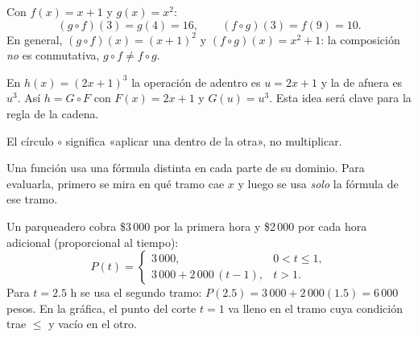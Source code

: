 \documentclass[11pt,a4paper]{article}
\let\nivelorig\nivel
\renewcommand{\nivel}[2]{\Needspace{8\baselineskip}\nivelorig{#1}{#2}}
\begin{document}
\begin{figura}[La composición encadena máquinas. Con $f(x)=x+1$ y $g(x)=x^2$: $g(f(3))=g(4)=16$.]
\end{figura}

\begin{ejemplo}
Con $f(x)=x+1$ y $g(x)=x^2$:
\[ (g\circ f)(3)=g(4)=16,\qquad (f\circ g)(3)=f(9)=10. \]
En general, $(g\circ f)(x)=(x+1)^2$ y $(f\circ g)(x)=x^2+1$: la composición \emph{no} es conmutativa, $g\circ f\ne f\circ g$.
\end{ejemplo}

\begin{ejemplo}
En $h(x)=(2x+1)^3$ la operación de adentro es $u=2x+1$ y la de afuera es $u^3$. Así $h=G\circ F$ con
$F(x)=2x+1$ y $G(u)=u^3$. Esta idea será clave para la regla de la cadena.
\end{ejemplo}

\begin{ojo}
El círculo $\circ$ significa «aplicar una dentro de la otra», no multiplicar.
\end{ojo}


\begin{definicion}
Una función  usa una fórmula distinta en cada parte de su dominio. Para evaluarla, primero se mira
en qué tramo cae $x$ y luego se usa \emph{solo} la fórmula de ese tramo.
\end{definicion}

\begin{ejemplo}[Un parqueadero]
Un parqueadero cobra \$3\,000 por la primera hora y \$2\,000 por cada hora adicional (proporcional al tiempo):
\[ P(t)=\begin{cases} 3\,000, & 0<t\le 1,\\ 3\,000+2\,000\,(t-1), & t>1.\end{cases} \]
Para $t=2.5$ h se usa el segundo tramo: $P(2.5)=3\,000+2\,000(1.5)=6\,000$ pesos. En la gráfica, el punto del
corte $t=1$ va lleno en el tramo cuya condición trae $\le$ y vacío en el otro.
\end{ejemplo}
\end{document}
